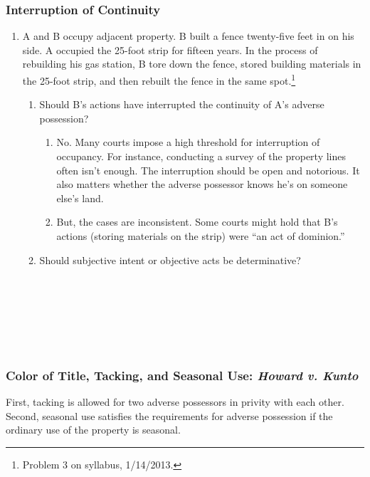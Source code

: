 \subsubsection{Interruption of Continuity}

\begin{enumerate}
    \item A and B occupy adjacent property. B built a fence twenty-five feet 
    in on his side. A occupied the 25-foot strip for fifteen years. In the 
    process of rebuilding his gas station, B tore down the fence, stored 
    building materials in the 25-foot strip, and then rebuilt the fence in the 
    same spot.\footnote{Problem 3 on syllabus, 1/14/2013.}
    \begin{enumerate}
        \item Should B's actions have interrupted the continuity of A's 
        adverse possession?
        \begin{enumerate}
            \item No. Many courts impose a high threshold for interruption of 
            occupancy. For instance, conducting a survey of the property lines 
            often isn't enough. The interruption should be open and notorious. 
            It also matters whether the adverse possessor knows he's on 
            someone else's land.
            \item But, the cases are inconsistent. Some courts might hold that 
            B's actions (storing materials on the strip) were ``an act of 
            dominion.''
        \end{enumerate}
        \item Should subjective intent or objective acts be determinative?
        ~\\\\\\\\\\\\\\%
    \end{enumerate}
\end{enumerate}

\subsubsection{Color of Title, Tacking, and Seasonal Use: \emph{Howard v. 
Kunto}}

First, tacking is allowed for two adverse possessors in privity with each 
other. Second, seasonal use satisfies the requirements for adverse possession 
if the ordinary use of the property is seasonal.

